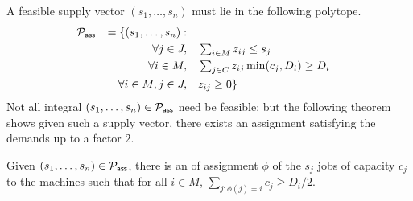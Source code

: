 \documentclass{article}[11pt]
\begin{document}
\noindent
A feasible supply vector $(s_1,\ldots,s_n)$ must lie in the following polytope.
	\begin{alignat}{4}
		{\cal P}_\mathsf{ass} && = \{(s_1,\ldots,s_n):  && \notag \\
		&& \quad \forall j \in J,   &\quad  \textstyle \sum_{i\in M} z_{ij}  \leq  s_j \label{eq:asslp1} \\
		&& \quad \forall i\in M ,  &\quad  \textstyle \sum_{j\in C}  z_{ij}  \min(c_j,D_i) \geq D_i \label{eq:asslp2} \\
		&& \quad \forall i\in M, j\in J, & \quad z_{ij}   \geq 0 \label{eq:asslp3}  \}
	\end{alignat}
Not all integral $(s_1,\ldots,s_n) \in {\cal P}_\mathsf{ass}$ need be feasible; but the following theorem shows given such a supply vector, there exists an assignment satisfying the demands up to a factor $2$.
\begin{theorem}\label{thm:asslprounding}
Given $(s_1,\ldots,s_n) \in {\cal P}_\mathsf{ass}$, there is an of assignment $\phi$ of the $s_j$ jobs of capacity $c_j$  to the machines such that for all $i\in M$, 
$\sum_{j:\phi(j) = i} c_j \geq D_i/2$.
\end{theorem}
\end{document}
